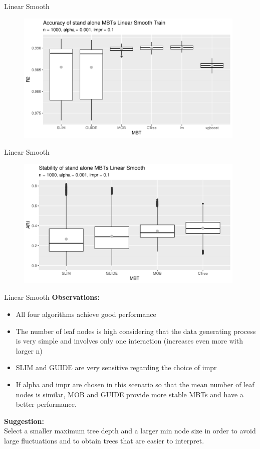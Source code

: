 \documentclass[9pt, xcolor=table]{beamer}
\begin{document}
\begin{frame}{Linear Smooth}
\begin{figure}
    \includegraphics[width=11cm]{Figures/simulations/batchtools/basic_scenarios/linear_smooth/ls_1000_standalone_r2_train.pdf}
\end{figure}  
    
\end{frame}

\begin{frame}{Linear Smooth}
\begin{figure}
    \includegraphics[width=11cm]{Figures/simulations/batchtools/basic_scenarios/linear_smooth/ls_1000_standalone_sta.pdf}
\end{figure}  
    
\end{frame}

\begin{frame}{Linear Smooth}
\textbf{Observations:}
\begin{itemize}
    \item All four algorithms achieve good performance
    \item The number of leaf nodes is high considering that the data generating process is very simple and involves only one interaction (increases even more with larger n)    
    \item SLIM and GUIDE are very sensitive regarding the choice of impr
    \item  If alpha and impr are chosen in this scenario so that the mean number of leaf nodes is similar, MOB and GUIDE provide more stable MBTs and have a better performance.

\end{itemize}

\textbf{Suggestion:}\\
Select a smaller maximum tree depth and a larger min node size in order to avoid large fluctuations and to obtain trees that are easier to interpret.

    
\end{frame}
\end{document}
